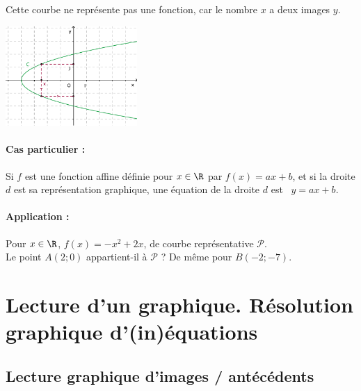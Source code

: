 \begin{rem}
  \begin{minipage}[t]{0.45\linewidth}
    Cette courbe ne représente pas une fonction, car le nombre $x$ a
    deux images $y$.    
  \end{minipage}
  \qquad
  \begin{minipage}[c]{0.4\linewidth}
    \includegraphics[width=5cm]{F_NonFct.pdf}
  \end{minipage}
\end{rem}


\paragraph{Cas particulier :} 
\begin{minipage}[t]{0.8\linewidth}
  Si $f$ est une fonction affine définie pour $x\in\R$ par 
  $f(x)=ax+b$, et si la droite $d$ est sa représentation graphique,
  une équation de la droite $d$ est \ $y=ax+b$.
\end{minipage}

\paragraph{Application :} 
\begin{minipage}[t]{0.8\linewidth}
  Pour $x\in\R$, $f(x)=-x^2+2x$, de courbe représentative
  $\mathscr{P}$.\\
  Le point $A(2;0)$ appartient-il à $\mathscr{P}$ ? De même pour
  $B(-2;-7)$.
  \vspace{4cm}
\end{minipage}



\section{Lecture d'un graphique. Résolution graphique d'(in)équations} 

\subsection{Lecture graphique d'images / antécédents}

